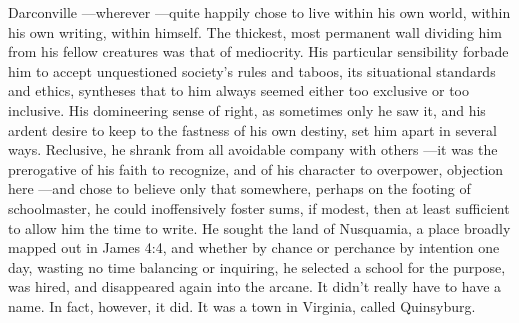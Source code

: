   Darconville ---wherever ---quite happily chose to live within his own world, 
within his own writing, within himself. The thickest, most permanent wall 
dividing him from his fellow creatures was that of mediocrity. His particular 
sensibility forbade him to accept unquestioned society's rules and taboos, 
its situational standards and ethics, syntheses that to him always seemed 
either too exclusive or too inclusive. His domineering 
sense of right, as sometimes only he saw it,
and his ardent desire to keep to the fastness 
of his own destiny, set him apart in several ways. Reclusive, 
he shrank from all avoidable company with others ---it was the prerogative 
of his faith to recognize, and of his character to
overpower, objection here ---and chose to believe only that somewhere, perhaps on
the footing of schoolmaster, he could inoffensively foster 
sums, if modest, then
at least sufficient to allow him the time to write. He sought the land of
Nusquamia, a place broadly mapped out in James 4:4, and whether by chance or
perchance 
by intention one day, wasting no time balancing or inquiring, he
selected a school for the purpose, was hired, and disappeared again into the
arcane. 
It didn't really have to have a name. In fact, however, it did. It was a
town in Virginia, called Quinsyburg.


